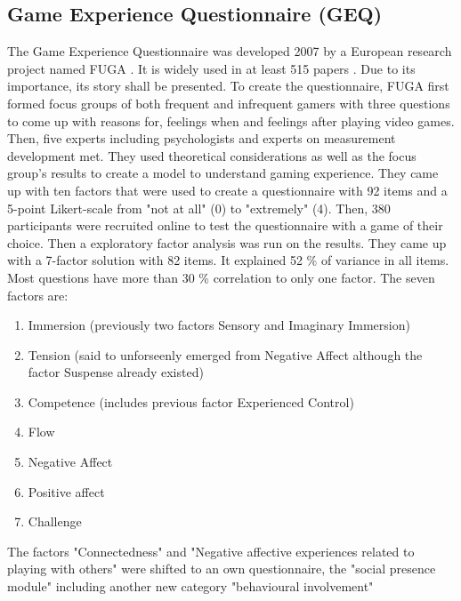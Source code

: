 \subsection{Game Experience Questionnaire (GEQ)}
The Game Experience Questionnaire was developed 2007 by a European research project named FUGA \cite{law2018systematic}. It is widely used in at least 515 papers \cite{law2018systematic}. Due to its importance, its story shall be presented. 
To create the questionnaire, FUGA first formed focus groups of both frequent and infrequent gamers with three questions to come up with reasons for, feelings when and feelings after playing video games. Then, five experts including psychologists and experts on measurement development met. They used theoretical considerations as well as the focus group's results to create a model to understand gaming experience. They came up with ten factors that were used to create a questionnaire with 92 items and a 5-point Likert-scale from "not at all" (0) to "extremely" (4).
Then, 380 participants were recruited online to test the questionnaire with a game of their choice. Then a exploratory factor analysis was run on the results. They came up with a 7-factor solution with 82 items. It explained 52 \% of variance in all items. Most questions have more than 30 \% correlation to only one factor. The seven factors are:
\begin{enumerate}
	\item Immersion (previously two factors Sensory and Imaginary Immersion)
	\item Tension (said to unforseenly emerged from Negative Affect although the factor Suspense already existed)
	\item Competence (includes previous factor Experienced Control)
	\item Flow
	\item Negative Affect
	\item Positive affect
	\item Challenge
\end{enumerate}
The factors "Connectedness" and "Negative affective experiences related to playing with others" were shifted to an own questionnaire, the "social presence module" including another new category "behavioural involvement" 

